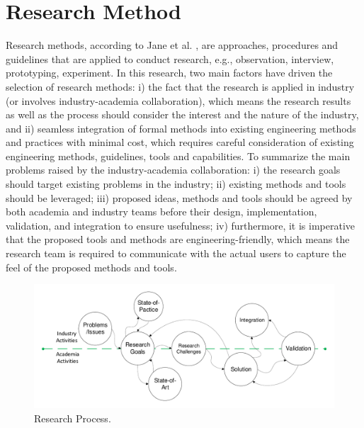 \chapter{Research Method}
\label{methods}
Research methods, according to Jane et al. \cite{qualitateiveresearch2012}, are approaches, procedures and guidelines that are applied to conduct research, e.g., observation, interview, prototyping, experiment. In this research, two main factors have driven the selection of research methods: i) the fact that the research is applied in industry (or involves industry-academia collaboration), which means the research results as well as the process should consider the interest and the nature of the industry, and ii) seamless integration of formal methods into existing engineering methods and practices with minimal cost, which requires careful consideration of existing engineering methods, guidelines, tools and capabilities. To summarize the main problems raised by the industry-academia collaboration: i) the research goals should target existing problems in the industry; ii) existing methods and tools should be leveraged; iii) proposed ideas, methods and tools should be agreed by both academia and industry teams before their design, implementation, validation, and integration to ensure usefulness; iv) furthermore, it is imperative that the proposed tools and methods are engineering-friendly, which means the research team is required to communicate with the actual users to capture the feel of the proposed methods and tools. 
\begin{figure}[h]
	\centering
	\includegraphics[trim=10 0 10 0, clip,width=1\linewidth]{images/research_process.pdf}
	\caption{Research Process.}
	\label{fig_research_process}
\end{figure}

